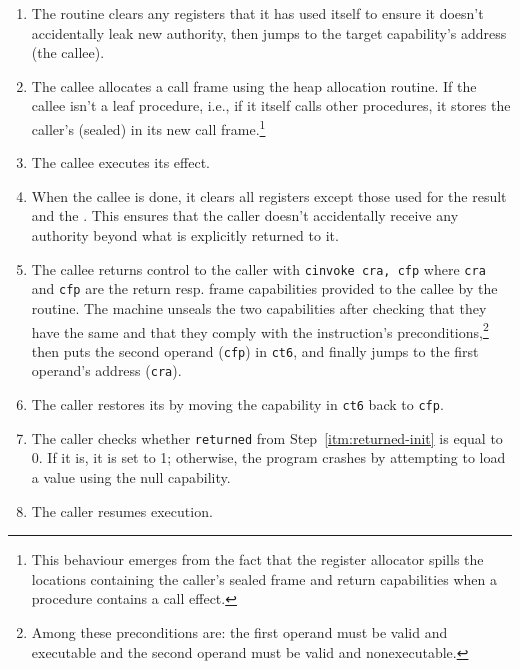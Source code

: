 \documentclass[main.tex]{subfiles}
\begin{document}
\begin{enumerate}
	\item The routine clears any registers that it has used itself to ensure it doesn't accidentally leak new authority, then jumps to the target capability's address (the callee).
	
	\item The callee allocates a call frame using the heap allocation routine. If the callee isn't a leaf procedure, i.e., if it itself calls other procedures, it stores the caller's (sealed)  in its new call frame.\footnote{This behaviour emerges from the fact that the register allocator spills the locations containing the caller's sealed frame and return capabilities when a procedure contains a call effect.}
	
	\item The callee executes its effect.
	
	\item When the callee is done, it clears all registers except those used for the result and the . This ensures that the caller doesn't accidentally receive any authority beyond what is explicitly returned to it.
	
	\item The callee returns control to the caller with \hbox{\texttt{cinvoke cra, cfp}} where \texttt{cra} and \texttt{cfp} are the return resp. frame capabilities provided to the callee by the  routine. The machine unseals the two capabilities after checking that they have the same  and that they comply with the instruction's preconditions,\footnote{Among these preconditions are: the first operand must be valid and executable and the second operand must be valid and nonexecutable.} then puts the second operand (\texttt{cfp}) in \texttt{ct6}, and finally jumps to the first operand's address (\texttt{cra}).
	
	\item The caller restores its  by moving the capability in \texttt{ct6} back to \texttt{cfp}.
	
	\item The caller checks whether \texttt{returned} from Step~\ref{itm:returned-init} is equal to 0. If it is, it is set to 1; otherwise, the program crashes by attempting to load a value using the null capability.
	
	\item The caller resumes execution.
	
\end{enumerate}
\end{document}
